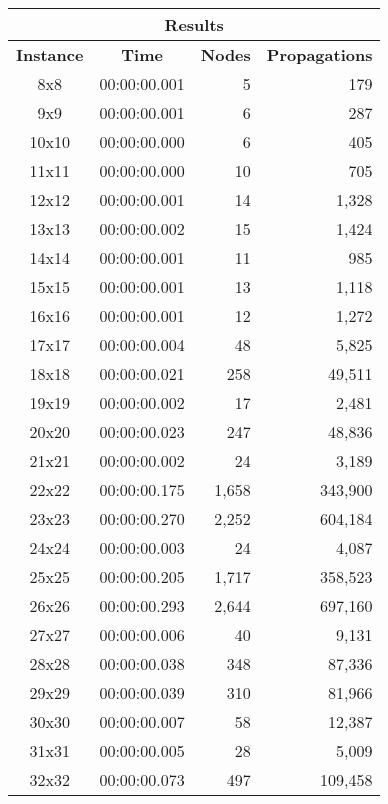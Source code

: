 
\begin{center}
    \begin{tabular}{|c|c|r|r|}
        \hline
        \multicolumn{4}{|c|}{\textbf{Results}} \\
        \hline
        \textbf{Instance} & \textbf{Time} & \textbf{Nodes} & \textbf{Propagations} \\
        
        \hline
		8x8 & 00:00:00.001 & 5 & 179 \\ \hline
		9x9 & 00:00:00.001 & 6 & 287 \\ \hline
		10x10 & 00:00:00.000 & 6 & 405 \\ \hline
		11x11 & 00:00:00.000 & 10 & 705 \\ \hline
		12x12 & 00:00:00.001 & 14 & 1,328 \\ \hline
		13x13 & 00:00:00.002 & 15 & 1,424 \\ \hline
		14x14 & 00:00:00.001 & 11 & 985 \\ \hline
		15x15 & 00:00:00.001 & 13 & 1,118 \\ \hline
		16x16 & 00:00:00.001 & 12 & 1,272 \\ \hline
		17x17 & 00:00:00.004 & 48 & 5,825 \\ \hline
		18x18 & 00:00:00.021 & 258 & 49,511 \\ \hline
		19x19 & 00:00:00.002 & 17 & 2,481 \\ \hline
		20x20 & 00:00:00.023 & 247 & 48,836 \\ \hline
		21x21 & 00:00:00.002 & 24 & 3,189 \\ \hline
		22x22 & 00:00:00.175 & 1,658 & 343,900 \\ \hline
		23x23 & 00:00:00.270 & 2,252 & 604,184 \\ \hline
		24x24 & 00:00:00.003 & 24 & 4,087 \\ \hline
		25x25 & 00:00:00.205 & 1,717 & 358,523 \\ \hline
		26x26 & 00:00:00.293 & 2,644 & 697,160 \\ \hline
		27x27 & 00:00:00.006 & 40 & 9,131 \\ \hline
		28x28 & 00:00:00.038 & 348 & 87,336 \\ \hline
		29x29 & 00:00:00.039 & 310 & 81,966 \\ \hline
		30x30 & 00:00:00.007 & 58 & 12,387 \\ \hline
		31x31 & 00:00:00.005 & 28 & 5,009 \\ \hline
		32x32 & 00:00:00.073 & 497 & 109,458 \\ \hline

\end{tabular}
\end{center}
